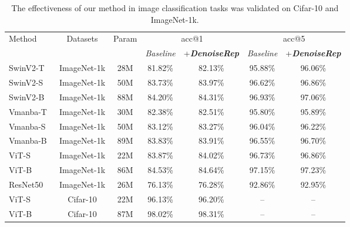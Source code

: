 \documentclass[conference]{IEEEtran}
\begin{document}
{\begin{table}[ht!]
\centering
\caption{The effectiveness of our method in image classification tasks was validated on Cifar-10 and ImageNet-1k.}
\label{tab: Large-Scale Image Classification V2}
\vspace{0.2cm}
\renewcommand{\arraystretch}{1.2} %
\begin{tabular}{l|c|c|cc|cc}
\hline \hline
\multirow{2}{*}{Method} & 
\multirow{2}{*}{Datasets} & 
\multirow{2}{*}{Param} & 
\multicolumn{2}{c|}{acc@1} & 
\multicolumn{2}{c}{acc@5} \\
 & & & \textit{Baseline} & +\textit{\textbf{DenoiseRep}} & \textit{Baseline} & +\textit{\textbf{DenoiseRep}} \\
\hline
SwinV2-T~\cite{liu2021swin} & ImageNet-1k & 28M & 81.82\% & 82.13\% & 95.88\% & 96.06\% \\
SwinV2-S~\cite{liu2021swin} & ImageNet-1k & 50M & 83.73\% & 83.97\% & 96.62\% & 96.86\% \\
SwinV2-B~\cite{liu2021swin} & ImageNet-1k & 88M & 84.20\% & 84.31\% & 96.93\% & 97.06\% \\
\hline
Vmanba-T~\cite{liu2024vmamba} & ImageNet-1k & 30M & 82.38\% & 82.51\% & 95.80\% & 95.89\% \\
Vmanba-S~\cite{liu2024vmamba} & ImageNet-1k & 50M & 83.12\% & 83.27\% & 96.04\% & 96.22\% \\
Vmanba-B~\cite{liu2024vmamba} & ImageNet-1k & 89M & 83.83\% & 83.91\% & 96.55\% & 96.70\% \\
\hline
ViT-S~\cite{dosovitskiy2020image} & ImageNet-1k & 22M & 83.87\% & 84.02\% & 96.73\% & 96.86\% \\
ViT-B~\cite{dosovitskiy2020image} & ImageNet-1k & 86M & 84.53\% & 84.64\% & 97.15\% & 97.23\% \\
\hline
ResNet50~\cite{he2016deep} & ImageNet-1k & 26M & 76.13\% & 76.28\% & 92.86\% & 92.95\% \\
\hline
ViT-S~\cite{dosovitskiy2020image} & Cifar-10 & 22M & 96.13\% & 96.20\% & -- & -- \\
ViT-B~\cite{dosovitskiy2020image} & Cifar-10 & 87M & 98.02\% & 98.31\% & -- & -- \\
\hline \hline
\end{tabular}
\end{table}

}
\end{document}
